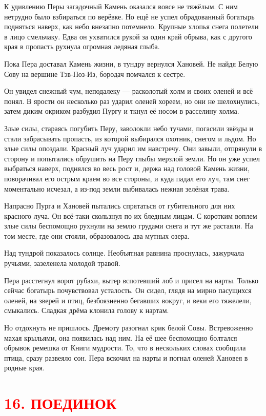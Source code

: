 \documentclass[12pt, a4paper, openany]{book}
\begin{document}
	К удивлению Перы загадочный Камень оказался вовсе не тяжёлым. С ним нетрудно было взбираться по верёвке. Но ещё не успел обрадованный богатырь подняться наверх, как небо внезапно потемнело. Крупные хлопья снега полетели в лицо смельчаку. Едва он ухватился рукой за один край обрыва, как с другого края в пропасть рухнула огромная ледяная глыба.
	
	Пока Пера доставал Камень жизни, в тундру вернулся Хановей. Не найдя Белую Сову на вершине Тэв-Поз-Из, бородач помчался к сестре.
	
	Он увидел снежный чум, неподалеку — расколотый холм и своих оленей и всё понял. В ярости он несколько раз ударил оленей хореем, но они не шелохнулись, затем диким окриком разбудил Пургу и ткнул её носом в расселину холма.
	
	Злые силы, стараясь погубить Перу, заволокли небо тучами, погасили звёзды и стали забрасывать пропасть, из которой выбирался охотник, снегом и льдом. Но злые силы опоздали. Красный луч ударил им навстречу. Они завыли, отпрянули в сторону и попытались обрушить на Перу глыбы мерзлой земли. Но он уже успел выбраться наверх, поднялся во весь рост и, держа над головой Камень жизни, поворачивал его острым краем во все стороны, и куда падал его луч, там снег моментально исчезал, а из-под земли выбивалась нежная зелёная трава.
	
	Напрасно Пурга и Хановей пытались спрятаться от губительного для них красного луча. Он всё-таки скользнул по их бледным лицам. С коротким воплем злые силы беспомощно рухнули на землю грудами снега и тут же растаяли. На том месте, где они стояли, образовалось два мутных озера.
	
	Над тундрой показалось солнце. Необъятная равнина проснулась, зажурчала ручьями, зазеленела молодой травой.
	
	Пера расстегнул ворот рубахи, вытер вспотевший лоб и присел на нарты. Только сейчас богатырь почувствовал усталость. Он сидел, глядя на мирно пасущихся оленей, на зверей и птиц, безбоязненно бегавших вокруг, и веки его тяжелели, смыкались. Сладкая дрёма клонила голову к нартам.
	
	Но отдохнуть не пришлось. Дремоту разогнал крик белой Совы. Встревоженно махая крыльями, она появилась над ним. На её шее беспомощно болтался обрывок ремешка от Книги мудрости. То, что в нескольких словах сообщила птица, сразу развеяло сон. Пера вскочил на нарты и погнал оленей Хановея в родные края.
	
	
				\section[16. Поединок]{\center \textcolor{red}{16. ПОЕДИНОК}}
\end{document}
